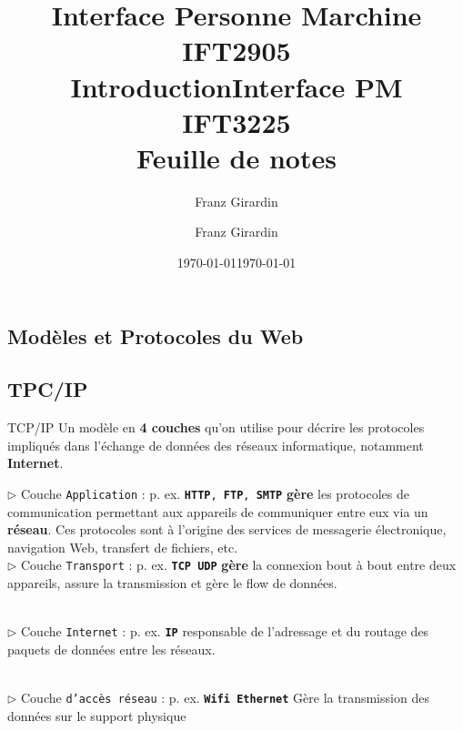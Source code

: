 \documentclass{report}
\title{\Huge{Interface Personne Marchine}\\{IFT2905}\\{\textbf{Introduction}}}
\author{\huge{Franz Girardin}}
\date{\today}
\title{\Huge{Interface PM}\\{IFT3225}\\{\textbf{Feuille de notes}}}
\author{\huge{Franz Girardin}}
\date{\today}
\begin{document}
\maketitle
\pagebreak
\tableofcontents
\pagebreak
\begin{multicols*}{3}


    \footnotesize
    \chapter{Modèles et Protocoles du Web }

\vspace{-2em}
    \section{TPC/IP}


\vspace{-1em}
\begin{Definitionx}{TCP/IP}{}
    Un modèle en \textbf{4 couches}  qu'on utilise pour décrire les protocoles 
    impliqués dans l'échange de données des réseaux informatique, notamment \textbf{Internet}.   
\end{Definitionx} 

$\rhd$ Couche \texttt{Application} : p. ex. \texttt{\textbf{HTTP}, \textbf{FTP}, \textbf{SMTP}} \textbf{gère} les  
protocoles de communication permettant aux appareils de communiquer entre eux via un \textbf{réseau}.   
Ces protocoles sont à l'origine des services de \textcolor{myb}{messagerie électronique}, 
\textcolor{myb}{navigation Web}, \textcolor{myb}{transfert de fichiers}, etc.     
\mbox{}\\

$\rhd$ Couche \texttt{Transport} : p. ex. \texttt{\textbf{TCP} \textbf{UDP}} \textbf{gère} la  
connexion bout à bout entre deux appareils, assure la transmission et gère le flow de données. 

\mbox{}\\


$\rhd$ Couche \texttt{Internet} : p. ex. \texttt{\textbf{IP}} responsable de l'adressage et du 
routage des paquets de données entre les réseaux. 

\mbox{}\\ 

$\rhd$ Couche \texttt{d'accès réseau} : p. ex. \texttt{\textbf{Wifi} \textbf{Ethernet}}
Gère la transmission des données sur le support physique

\mbox{}\\


\end{multicols*}
\end{document}
